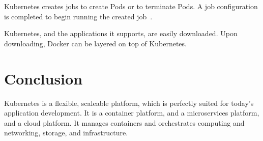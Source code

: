 Kubernetes creates jobs to create Pods or to terminate Pods.  A job
configuration is completed to begin running the created
job~\cite{concept}.   




Kubernetes, and the applications it supports, are easily downloaded.
Upon downloading, Docker can be layered on top of Kubernetes.   

\section{Conclusion}

Kubernetes is a flexible, scaleable platform, which is perfectly
suited for today's application development.  It is a container
platform, and a microservices platform, and a cloud platform.  It
manages containers and orchestrates computing and networking, storage,
and infrastructure.  













